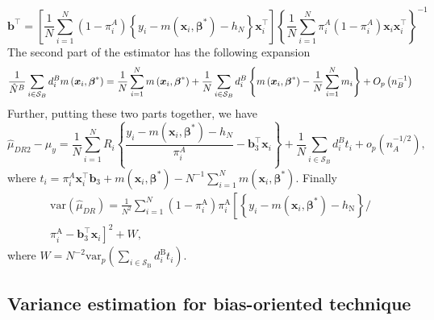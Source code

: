 \documentclass[
  letterpaper,
  DIV=11,
  numbers=noendperiod]{scrreprt}
\begin{document}
\[
\mathbf{b}^{\top}=\left[\frac{1}{N} \sum_{i=1}^N\left(1-\pi_i^A\right)\left\{y_i-m\left(\boldsymbol{x}_i, \boldsymbol{\beta}^*\right)-h_N\right\} \boldsymbol{x}_i^{\top}\right]\left\{\frac{1}{N} \sum_{i=1}^N \pi_i^A\left(1-\pi_i^A\right) \boldsymbol{x}_i \boldsymbol{x}_i^{\top}\right\}^{-1}
\] The second part of the estimator has the following expansion \[
\frac{1}{\hat{N}^B} \sum_{i \in \mathcal{S}_B} d_i^B m\left(\boldsymbol{x}_i,\boldsymbol{\beta}^*\right)=\frac{1}{N} \sum_{i=1}^N m\left(\boldsymbol{x}_i,\boldsymbol{\beta}^*\right)+\frac{1}{N} \sum_{i \in \mathcal{S}_B} d_i^B\left\{m\left(\boldsymbol{x}_i,\boldsymbol{\beta}^*\right)-\frac{1}{N} \sum_{i=1}^N m_i\right\}+O_p\left(n_B^{-1}\right)
\] Further, putting these two parts together, we have \[
\hat{\mu}_{D R 2}-\mu_y=\frac{1}{N} \sum_{i=1}^N R_i\left\{\frac{y_i-m\left(\boldsymbol{x}_i, \boldsymbol{\beta}^*\right)-h_N}{\pi_i^A}-\mathbf{b}_3^{\top} \boldsymbol{x}_i\right\}+\frac{1}{N} \sum_{i \in \mathcal{S}_B} d_i^B t_i+o_p\left(n_A^{-1 / 2}\right),
\] where
\(t_i=\pi_i^A \boldsymbol{x}_i^{\top} \mathbf{b}_3+m\left(\boldsymbol{x}_i, \boldsymbol{\beta}^*\right)-N^{-1} \sum_{i=1}^N m\left(\boldsymbol{x}_i, \boldsymbol{\beta}^*\right)\).
Finally \[
\begin{gathered} \text{var}(\hat{\mu}_{DR}) =
\frac{1}{N^2} \sum_{i=1}^N\left(1-\pi_i^{\mathrm{A}}\right) \pi_i^{\mathrm{A}}\left[\left\{y_i-m\left(\boldsymbol{x}_i, \boldsymbol{\beta}^*\right)-h_{\mathrm{N}}\right\} /\right. \\
\left.\pi_i^{\mathrm{A}}-\mathbf{b}_3^{\top} \boldsymbol{x}_i\right]^2+W,
\end{gathered}
\] where
\(W = N^{-2} \text{var}_p\left(\sum_{i \in \mathcal{S}_{\mathrm{B}}} d_i^{\mathrm{B}} t_i\right)\).

\subsection{Variance estimation for bias-oriented
technique}\label{variance-estimation-for-bias-oriented-technique}
\end{document}
